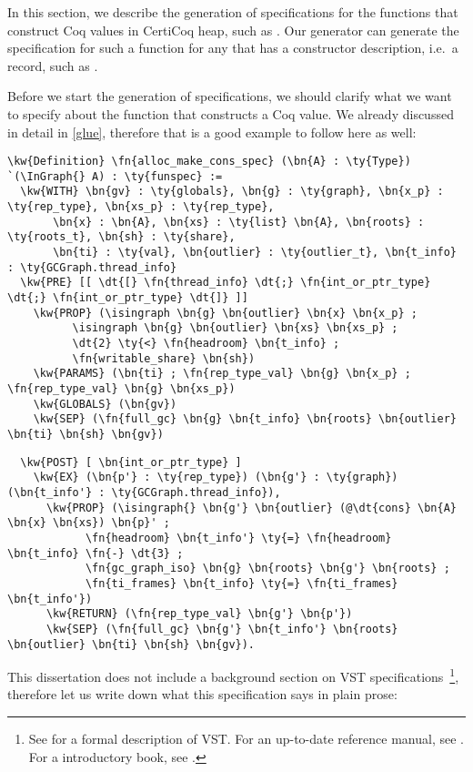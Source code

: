 In this section, we describe the generation of specifications for the \glue{} functions that construct Coq values in \gls{CertiCoq heap}, such as \allocmakecons{}. Our generator can generate the specification for such a function for any \constructor{} that has a constructor description, i.e.\ a \ctordesc{} record, such as \consdesc{}.

Before we start the generation of specifications, we should clarify what we want to specify about the \glue{} function that constructs a Coq value. We already discussed \allocmakecons{} in detail in \autoref{glue}, therefore that is a good example to follow here as well:

\begin{Verbatim}
\kw{Definition} \fn{alloc_make_cons_spec} (\bn{A} : \ty{Type}) `(\InGraph{} A) : \ty{funspec} :=
  \kw{WITH} \bn{gv} : \ty{globals}, \bn{g} : \ty{graph}, \bn{x_p} : \ty{rep_type}, \bn{xs_p} : \ty{rep_type},
       \bn{x} : \bn{A}, \bn{xs} : \ty{list} \bn{A}, \bn{roots} : \ty{roots_t}, \bn{sh} : \ty{share},
       \bn{ti} : \ty{val}, \bn{outlier} : \ty{outlier_t}, \bn{t_info} : \ty{GCGraph.thread_info}
  \kw{PRE} [[ \dt{[} \fn{thread_info} \dt{;} \fn{int_or_ptr_type} \dt{;} \fn{int_or_ptr_type} \dt{]} ]]
    \kw{PROP} (\isingraph \bn{g} \bn{outlier} \bn{x} \bn{x_p} ;
          \isingraph \bn{g} \bn{outlier} \bn{xs} \bn{xs_p} ;
          \dt{2} \ty{<} \fn{headroom} \bn{t_info} ;
          \fn{writable_share} \bn{sh})
    \kw{PARAMS} (\bn{ti} ; \fn{rep_type_val} \bn{g} \bn{x_p} ; \fn{rep_type_val} \bn{g} \bn{xs_p})
    \kw{GLOBALS} (\bn{gv})
    \kw{SEP} (\fn{full_gc} \bn{g} \bn{t_info} \bn{roots} \bn{outlier} \bn{ti} \bn{sh} \bn{gv})
\end{Verbatim}
\newpage
\begin{Verbatim}
  \kw{POST} [ \bn{int_or_ptr_type} ]
    \kw{EX} (\bn{p'} : \ty{rep_type}) (\bn{g'} : \ty{graph}) (\bn{t_info'} : \ty{GCGraph.thread_info}),
      \kw{PROP} (\isingraph{} \bn{g'} \bn{outlier} (@\dt{cons} \bn{A} \bn{x} \bn{xs}) \bn{p}' ;
            \fn{headroom} \bn{t_info'} \ty{=} \fn{headroom} \bn{t_info} \fn{-} \dt{3} ;
            \fn{gc_graph_iso} \bn{g} \bn{roots} \bn{g'} \bn{roots} ;
            \fn{ti_frames} \bn{t_info} \ty{=} \fn{ti_frames} \bn{t_info'})
      \kw{RETURN} (\fn{rep_type_val} \bn{g'} \bn{p'})
      \kw{SEP} (\fn{full_gc} \bn{g'} \bn{t_info'} \bn{roots} \bn{outlier} \bn{ti} \bn{sh} \bn{gv}).
\end{Verbatim}

This dissertation does not include a background section on VST specifications~\footnote{See \citet{appel2014program} for a formal description of VST. For an up-to-date reference manual, see \citet{appel2023verifiable}. For a introductory book, see \citet{appel2023sf}.}, therefore let us write down what this specification says in plain prose: 

